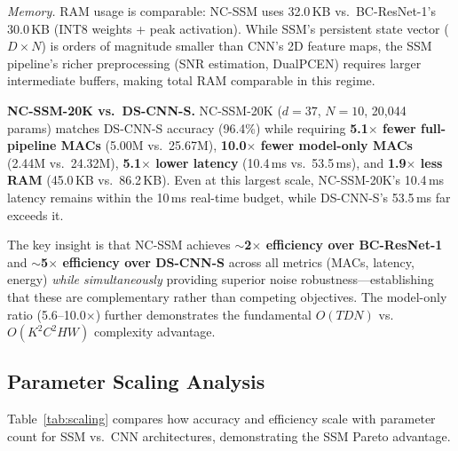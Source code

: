 \documentclass[journal]{IEEEtran}
\begin{document}
\emph{Memory.}
RAM usage is comparable: NC-SSM uses 32.0\,KB vs.\ BC-ResNet-1's 30.0\,KB (INT8 weights + peak activation).
While SSM's persistent state vector ($D \times N$) is orders of magnitude smaller than CNN's 2D feature maps, the SSM pipeline's richer preprocessing (SNR estimation, DualPCEN) requires larger intermediate buffers, making total RAM comparable in this regime.

\smallskip\noindent\textbf{NC-SSM-20K vs.\ DS-CNN-S.}
NC-SSM-20K ($d{=}37$, $N{=}10$, 20{,}044 params) matches DS-CNN-S accuracy (96.4\%) while requiring \textbf{5.1$\times$ fewer full-pipeline MACs} (5.00M vs.\ 25.67M), \textbf{10.0$\times$ fewer model-only MACs} (2.44M vs.\ 24.32M), \textbf{5.1$\times$ lower latency} (10.4\,ms vs.\ 53.5\,ms), and \textbf{1.9$\times$ less RAM} (45.0\,KB vs.\ 86.2\,KB).
Even at this largest scale, NC-SSM-20K's 10.4\,ms latency remains within the 10\,ms real-time budget, while DS-CNN-S's 53.5\,ms far exceeds it.

\smallskip
The key insight is that NC-SSM achieves \textbf{$\sim$2$\times$ efficiency over BC-ResNet-1} and \textbf{$\sim$5$\times$ efficiency over DS-CNN-S} across all metrics (MACs, latency, energy) \emph{while simultaneously} providing superior noise robustness---establishing that these are complementary rather than competing objectives.
The model-only ratio (5.6--10.0$\times$) further demonstrates the fundamental $O(TDN)$ vs.\ $O(K^2C^2HW)$ complexity advantage.

\subsection{Parameter Scaling Analysis}

Table~\ref{tab:scaling} compares how accuracy and efficiency scale with parameter count for SSM vs.\ CNN architectures, demonstrating the SSM Pareto advantage.
\end{document}
